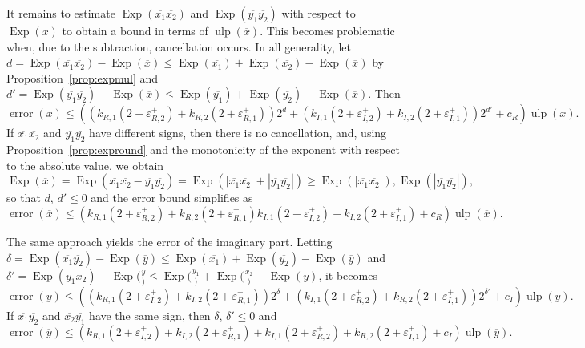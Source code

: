 \documentclass {article}
\newcommand {\appro}[1]{\overline {#1}}
\newcommand {\Ulp}{{\operatorname {ulp}}}
\DeclareMathOperator{\Exp}{\operatorname {Exp}}
\newcommand{\error}{\operatorname {error}}
\renewcommand {\epsilon}{\varepsilon}
\renewcommand {\leq}{\leqslant}
\renewcommand {\geq}{\geqslant}
\begin{document}
It remains to estimate $\Exp (\appro {x_1} \appro {x_2})$ and
$\Exp (\appro {y_1} \appro {y_2})$ with respect to $\Exp (x)$ to obtain
a bound in terms of $\Ulp (\appro x)$. This becomes problematic when, due
to the subtraction, cancellation occurs. In all generality, let
$d = \Exp (\appro {x_1} \appro {x_2}) - \Exp (\appro x)
\leq \Exp (\appro {x_1}) + \Exp (\appro {x_2}) - \Exp (\appro x)$
by Proposition~\ref {prop:expmul} and
$d' = \Exp( \appro {y_1} \appro {y_2}) - \Exp (\appro x)
\leq \Exp (\appro {y_1}) + \Exp (\appro {y_2}) - \Exp (\appro x)$.
Then
\[
\error( \appro x) \leq \left(
   \left( k_{R, 1} (2 + \epsilon_{R, 2}^+)
   + k_{R, 2} (2 + \epsilon_{R, 1}^+) \right) 2^d
   + \left( k_{I, 1} (2 + \epsilon_{I, 2}^+)
   + k_{I, 2} (2 + \epsilon_{I, 1}^+) \right) 2^{d'}
   + c_R
   \right) \Ulp (\appro x).
\]
If $\appro {x_1} \appro {x_2}$ and $\appro {y_1} \appro {y_2}$ have different
signs, then there is no cancellation, and,
using Proposition~\ref {prop:expround} and the monotonicity of the exponent
with respect to the absolute value, we obtain
\[
\Exp (\appro x) = \Exp (\appro {x_1} \appro {x_2} - \appro {y_1} \appro {y_2})
= \Exp (|\appro {x_1} \appro {x_2}| + |\appro {y_1} \appro {y_2}|)
\geq \Exp (|\appro {x_1} \appro {x_2}|), \Exp (|\appro {y_1} \appro {y_2}|),
\]
so that $d$, $d' \leq 0$ and the error bound simplifies as
\[
\error( \appro x) \leq \left(
   k_{R, 1} (2 + \epsilon_{R, 2}^+)
   + k_{R, 2} (2 + \epsilon_{R, 1}^+)
   k_{I, 1} (2 + \epsilon_{I, 2}^+)
   + k_{I, 2} (2 + \epsilon_{I, 1}^+)
   + c_R
   \right) \Ulp (\appro x).
\]

The same approach yields the error of the imaginary part. Letting
$\delta = \Exp (\appro {x_1} \appro {y_2}) - \Exp (\appro y)
\leq \Exp( \appro {x_1}) + \Exp (\appro {y_2}) - \Exp (\appro y)$ and
$\delta' = \Exp (\appro {y_1} \appro {x_2}) - \Exp (\frac {y})
\leq \Exp (\frac {y_1}) + \Exp (\frac {x_2}) - \Exp (\appro y)$,
it becomes
\[
\error( \appro y) \leq \left(
   \left( k_{R, 1} (2 + \epsilon_{I, 2}^+)
   + k_{I, 2} (2 + \epsilon_{R, 1}^+) \right) 2^{\delta}
   + \left( k_{I, 1} (2 + \epsilon_{R, 2}^+)
   + k_{R, 2} (2 + \epsilon_{I, 1}^+) \right) 2^{\delta'}
   + c_I
   \right) \Ulp (\appro y).
\]
If $\appro {x_1} \appro {y_2}$ and $\appro {x_2} \appro {y_1}$ have
the same sign, then $\delta$, $\delta' \leq 0$ and
\[
\error( \appro y) \leq \left(
   k_{R, 1} (2 + \epsilon_{I, 2}^+)
   + k_{I, 2} (2 + \epsilon_{R, 1}^+)
   + k_{I, 1} (2 + \epsilon_{R, 2}^+)
   + k_{R, 2} (2 + \epsilon_{I, 1}^+)
   + c_I
   \right) \Ulp (\appro y).
\]
\end{document}
